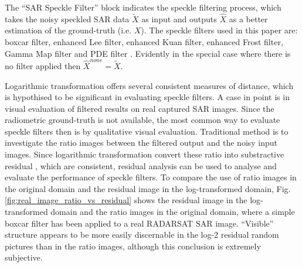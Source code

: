 \documentclass[journal]{IEEEtran}
\begin{document}
The ``SAR Speckle Filter'' block indicates the speckle filtering process, 
	which takes the noisy speckled SAR data $\tilde{X}$ as input
	and outputs $\hat{X}$ as a better estimation of the ground-truth (i.e. $X$).
The speckle filters used in this paper are: 
	boxcar filter, enhanced Lee filter, enhanced Kuan filter, enhanced Frost filter, Gamma Map filter and PDE filter \cite{You_TIP_2000}.
Evidently in the special case where there is no filter applied then $\hat{X}^{none} = \tilde{X}$.

Logarithmic transformation offers several consistent measures of distance, 
	which is hypothised to be significant  in evaluating speckle filters.
	A case in point is in visual evaluation of filtered results on real captured SAR images.
Since the radiometric ground-truth is not available, %
	the most common way to evaluate speckle filters then is by qualitative visual evaluation.
Traditional method is to investigate the ratio images between the filtered output and the noisy input images.
Since logarithmic transformation convert these ratio into substractive residual
	, which are consistent, residual analysis can be used to analyse and evaluate the performance of speckle filters.
To compare the use of ratio images in the original domain and the residual image in the log-transformed domain, Fig. \ref{fig:real_image_ratio_vs_residual} shows the residual image in the log-transformed domain and the ratio images in the original domain, where a simple boxcar filter has been applied to a real RADARSAT SAR image.
``Visible'' structure appears to be more easily discernable in the log-2 residual random pictures than in the ratio images, although this conclusion is extremely subjective.

\end{document}
